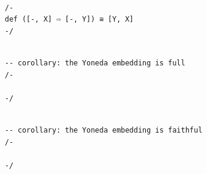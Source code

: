 \documentclass{book}
\newcounter{lcounter}
\begin{document}
\begin{center}
\begin{tcolorbox}[width=5in,colback={white},title={\begin{center}\texttt{Lean \thelcounter} \addtocounter{lcounter}{1}  \end{center}},colbacktitle=Blue,coltitle=black]
\begin{verbatim}

/-
def ([-, X] ⇨ [-, Y]) ≅ [Y, X]
-/

\end{verbatim}%
\end{tcolorbox}
\end{center}


\begin{center}
\begin{tcolorbox}[width=5in,colback={white},title={\begin{center}\texttt{Lean \thelcounter} \addtocounter{lcounter}{1}  \end{center}},colbacktitle=Blue,coltitle=black]
\begin{verbatim}

-- corollary: the Yoneda embedding is full
/-

-/

\end{verbatim}%
\end{tcolorbox}
\end{center}


\begin{center}
\begin{tcolorbox}[width=5in,colback={white},title={\begin{center}\texttt{Lean \thelcounter} \addtocounter{lcounter}{1}  \end{center}},colbacktitle=Blue,coltitle=black]
\begin{verbatim}

-- corollary: the Yoneda embedding is faithful
/-

-/

\end{verbatim}%
\end{tcolorbox}
\end{center}
\end{document}
